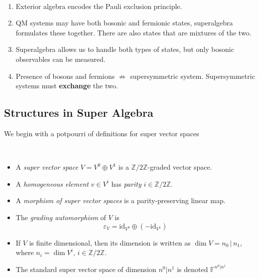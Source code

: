 \begin{remark}
\,
    \begin{enumerate}
        \item Exterior algebra encodes the Pauli exclusion principle.
        \item QM systems may have both bosonic and fermionic states, superalgebra formulates these together. There are also states that are mixtures of the two.
        \item Superalgebra allows us to handle both types of states, but only bosonic observables can be measured.
        \item Presence of bosons and fermions $\not\Rightarrow$ supersymmetric system. Supersymmetric systems must \textbf{exchange} the two.
    \end{enumerate}
\end{remark}

\subsection{Structures in Super Algebra}

We begin with a potpourri of definitions for super vector spaces
\begin{definition}
    \,
    \begin{itemize}
        \item A \emph{super vector space} $V = V^0 \oplus V^1$ is a \(\mathbb{Z}/2\mathbb{Z}\)-graded vector space.
        \item A \emph{homogeneous element} $v \in V^i$ has \emph{parity} $i \in \mathbb{Z}/2\mathbb{Z}$.
        \item A \emph{morphism of super vector spaces} is a parity-preserving linear map. 
        \item The \emph{grading automorphism} of $V$ is
    \begin{equation*}
        \varepsilon_V = \mathrm{id}_{V^0} \oplus (-\mathrm{id}_{V^1})
    \end{equation*}
    \item If $V$ is finite dimensional, then its dimension is written as $\dim V = n_0 \,|\, n_1$, where $n_i = \dim V^i$, $i \in \mathbb{Z}/2\mathbb{Z}$.
    \item The standard super vector space of dimension $n^0|n^1$ is denoted $\mathbb{F}^{n^0|n^1}$
    \end{itemize}
\end{definition}


